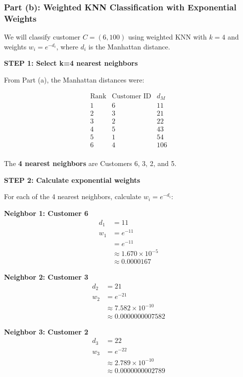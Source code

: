 \documentclass[12pt]{article}
\begin{document}
\newpage
\subsubsection{Part (b): Weighted KNN Classification with Exponential Weights}

\begin{solution}
We will classify customer \(C = (6, 100)\) using weighted KNN with \(k=4\) and weights \(w_i = e^{-d_i}\), where \(d_i\) is the Manhattan distance.

\textbf{STEP 1: Select k=4 nearest neighbors}

From Part (a), the Manhattan distances were:

\[
\begin{array}{c|c|c}
\text{Rank} & \text{Customer ID} & d_M \\
\hline
1 & 6 & 11 \\
2 & 3 & 21 \\
3 & 2 & 22 \\
4 & 5 & 43 \\
\hline
5 & 1 & 54 \\
6 & 4 & 106 \\
\end{array}
\]

The \textbf{4 nearest neighbors} are Customers 6, 3, 2, and 5.

\textbf{STEP 2: Calculate exponential weights}

For each of the 4 nearest neighbors, calculate \(w_i = e^{-d_i}\):

\textbf{Neighbor 1: Customer 6}
\begin{align*}
d_1 &= 11 \\
w_1 &= e^{-11} \\
&= e^{-11} \\
&\approx 1.670 \times 10^{-5} \\
&\approx \boxed{0.0000167}
\end{align*}

\textbf{Neighbor 2: Customer 3}
\begin{align*}
d_2 &= 21 \\
w_2 &= e^{-21} \\
&\approx 7.582 \times 10^{-10} \\
&\approx \boxed{0.0000000007582}
\end{align*}

\textbf{Neighbor 3: Customer 2}
\begin{align*}
d_3 &= 22 \\
w_3 &= e^{-22} \\
&\approx 2.789 \times 10^{-10} \\
&\approx \boxed{0.0000000002789}
\end{align*}


\end{solution}
\end{document}
